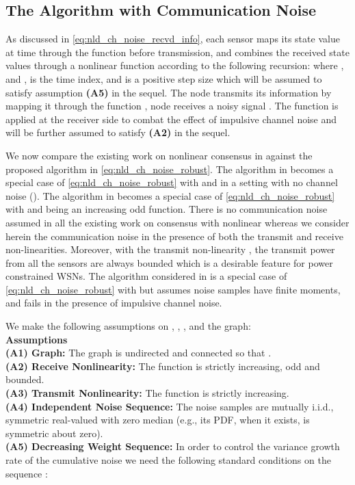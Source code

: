 \documentclass[onecolumn, draft, 12pt]{IEEEtran}
\begin{document}
\subsection{The  Algorithm with Communication Noise}\label{subsec:nld_with_noise_robust}
As discussed in \eqref{eq:nld_ch_noise_recvd_info}, each sensor maps its state value at time  through the function  before transmission, and combines the received state values through a nonlinear function  according to the following recursion: 
where , and , is the time index, and  is a positive step size which will be assumed to satisfy assumption \textbf{(A5)} in the sequel. The node  transmits its information  by mapping it through the function , node  receives a noisy signal . The function  is applied at the receiver side to combat the effect of impulsive channel noise  and will be further assumed to satisfy \textbf{(A2)} in the sequel.

We now compare the existing work on nonlinear consensus in \cite{KhanKar,OlfatiSaber2003,Ulrich2008,HuiWassim2008,WenwuChen2011,Ajorlou2011} against the proposed algorithm in \eqref{eq:nld_ch_noise_robust}. The algorithm in \cite{KhanKar} becomes a special case of \eqref{eq:nld_ch_noise_robust} with  and  in a setting with no channel noise (). The algorithm in \cite{OlfatiSaber2003} becomes a special case of \eqref{eq:nld_ch_noise_robust} with  and  being an increasing odd function. There is no communication noise assumed in all the existing work on consensus with nonlinear  \cite{KhanKar,OlfatiSaber2003,Ulrich2008,HuiWassim2008,WenwuChen2011,Ajorlou2011} whereas we consider herein the communication noise in the presence of both the transmit and receive non-linearities. Moreover, with the transmit non-linearity , the transmit power from all the sensors are always bounded which is a desirable feature for power constrained WSNs. The  algorithm considered in \cite{dastep2013} is a special case of \eqref{eq:nld_ch_noise_robust} with  but assumes noise samples have finite moments, and fails in the presence of impulsive channel noise.

We make the following assumptions on , , ,  and the graph: 
\\
\textbf{Assumptions \;}\\
\textbf{(A1) Graph:\;} The graph  is undirected and connected so that  \cite{chung}.\\
\textbf{(A2) Receive Nonlinearity:\;} The function  is strictly increasing, odd and bounded.\\   
\textbf{(A3) Transmit Nonlinearity:\;} The function  is strictly increasing.\\ 
\textbf{(A4) Independent Noise Sequence:\;} The noise samples  are mutually i.i.d., symmetric real-valued with zero median (e.g., its PDF, when it exists, is symmetric about zero). \\  
\textbf{(A5) Decreasing Weight Sequence:\;} In order to control the variance growth rate of the cumulative noise we need the following standard conditions on the sequence :
 
\end{document}
